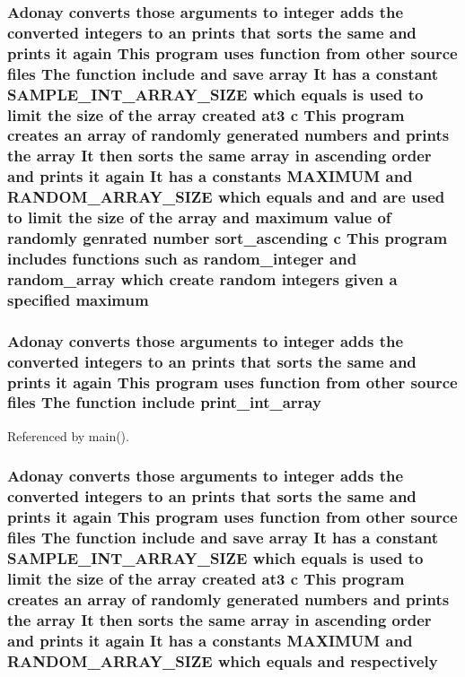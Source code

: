 \subsubsection[{maximum}]{\setlength{\rightskip}{0pt plus 5cm}Adonay converts those arguments to integer adds the converted integers to an prints that sorts the same and prints it again This program uses function from other source files The function include and save {\bf array} It has a constant {\bf S\+A\+M\+P\+L\+E\+\_\+\+I\+N\+T\+\_\+\+A\+R\+R\+A\+Y\+\_\+\+S\+I\+ZE} which equals is used to limit the size of the {\bf array} created at3 c This program creates an {\bf array} of randomly generated numbers and prints the {\bf array} It then sorts the same {\bf array} in ascending order and prints it again It has a constants {\bf M\+A\+X\+I\+M\+UM} and {\bf R\+A\+N\+D\+O\+M\+\_\+\+A\+R\+R\+A\+Y\+\_\+\+S\+I\+ZE} which equals and and are used to limit the size of the {\bf array} and maximum value of randomly genrated number {\bf sort\+\_\+ascending} c This program includes functions such as {\bf random\+\_\+integer} and {\bf random\+\_\+array} which create random integers given a specified maximum}\label{readme_8txt_a19050f7fe040165787d88bef4cfad466}
\subsubsection[{print\+\_\+int\+\_\+array}]{\setlength{\rightskip}{0pt plus 5cm}Adonay converts those arguments to integer adds the converted integers to an prints that sorts the same and prints it again This program uses function from other source files The function include print\+\_\+int\+\_\+array}\label{readme_8txt_a800e6351d04c08a36c07d6e9871b7771}


Referenced by main().

\subsubsection[{respectively}]{\setlength{\rightskip}{0pt plus 5cm}Adonay converts those arguments to integer adds the converted integers to an prints that sorts the same and prints it again This program uses function from other source files The function include and save {\bf array} It has a constant {\bf S\+A\+M\+P\+L\+E\+\_\+\+I\+N\+T\+\_\+\+A\+R\+R\+A\+Y\+\_\+\+S\+I\+ZE} which equals is used to limit the size of the {\bf array} created at3 c This program creates an {\bf array} of randomly generated numbers and prints the {\bf array} It then sorts the same {\bf array} in ascending order and prints it again It has a constants {\bf M\+A\+X\+I\+M\+UM} and {\bf R\+A\+N\+D\+O\+M\+\_\+\+A\+R\+R\+A\+Y\+\_\+\+S\+I\+ZE} which equals and respectively}\label{readme_8txt_a7595b9a0330ed73a504c87bfb8041aeb}
